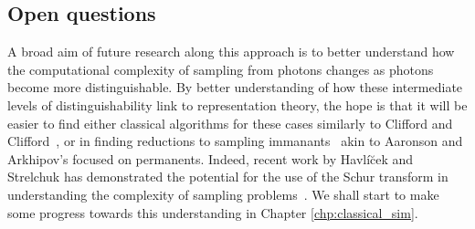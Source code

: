 \subsection{Open questions}

A broad aim of future research along this approach is to better understand how the computational complexity of sampling from photons changes as photons become more distinguishable. 
By better understanding of how these intermediate levels of distinguishability link to representation theory, the hope is that it will be easier to find either classical algorithms for these cases similarly to Clifford and Clifford~\cite{clifford2017}, or in finding reductions to sampling immanants~\cite{burgisser2000immanants} akin to Aaronson and Arkhipov's focused on permanents. 
Indeed, recent work by Havl\'{i}\u{c}ek and Strelchuk has demonstrated the potential for the use of the Schur transform in understanding the complexity of sampling problems~\cite{havlicek2018}. We shall start to make some progress towards this understanding in Chapter \ref{chp:classical_sim}.